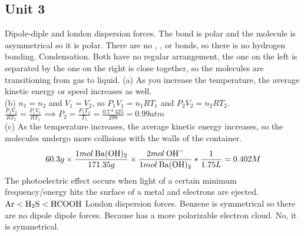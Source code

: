 \documentclass[../main.tex]{subfiles}
\begin{document}
\subsection{Unit 3}
\AnswerSet
Dipole-diple and london dispersion forces. The  bond is polar and the molecule is asymmetrical so it is polar. There are no , , or  bonds, so there is no hydrogen bonding. 
\AnswerSet
Condensation. Both have no regular arrangement, the one on the left is separated by the one on the right is close together, so the molecules are transitioning from gas to liquid.
\AnswerSet
(a) As you increase the temperature, the average kinetic energy or speed increases as well. \\
(b) \(n_1 = n_2\) and \(V_1 = V_2\), so \(P_1V_1 = n_1RT_1\) and \(P_2V_2 = n_2RT_2\). \(\frac{P_2V_2}{RT_2} = \frac{P_1V_1}{RT_1} \implies P_2 = \frac{P_1T_2}{T_1} = \frac{0.7 * 425}{299} = 0.99atm\)\\
(c) As the temperature increases, the average kinetic energy increases, so the molecules undergo more collisions with the walls of the container.  \\
\AnswerSet
\begin{equation*}
    60.3g \times \frac{1mol\hspace{0.2em}\ce{Ba(OH)2}}{171.35g} \times \frac{2mol\hspace{0.2em}\ce{OH-}}{1mol\hspace{0.2em}\ce{Ba(OH)2}} * \frac{1}{1.75L} = 0.402M
\end{equation*}
\AnswerSet
The photoelectric effect occurs when light of a certain minimum frequency/energy hits the surface of a metal and electrons are ejected. 
\AnswerSet
\(\ce{Ar} < \ce{H2S} < \ce{HCOOH}\)
\AnswerSet
London dispersion forces. Benzene is symmetrical so there are no dipole dipole forces.
\AnswerSet
{} 
\AnswerSet
Because  has a more polarizable electron cloud. 
\AnswerSet
No, it is symmetrical.
\end{document}
